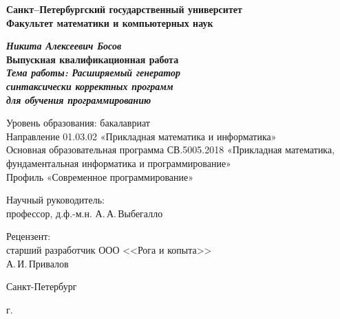 \begin{titlepage}
\begin{center}

\textbf{Санкт--Петербургский государственный университет}\\
\textbf{Факультет математики и компьютерных наук}


\vspace{35mm}

\textbf{\textit{\large Никита Алексеевич Босов}} \\[8mm]
\textbf{\large Выпускная квалификационная работа}\\[3mm]
\textbf{\textit{\large Тема работы:  Расширяемый генератор\\синтаксически корректных программ\\для обучения программированию}}

\vspace{20mm}
Уровень образования: бакалавриат\\
Направление 01.03.02 «Прикладная математика и информатика»\\
Основная образовательная программа СВ.5005.2018
«Прикладная математика, фундаментальная информатика и программирование»\\
Профиль «Современное программирование»\\[25mm]


\begin{flushright}
\begin{minipage}[t]{0.65\textwidth}
{Научный руководитель:} \\
профессор, д.ф.-м.н. А.\,А.\,Выбегалло
\vspace{10mm}

{Рецензент:} \\
старший разработчик ООО <<Рога и копыта>>\\ А.\,И.\,Привалов
\end{minipage}
\end{flushright}

\vfill

{Санкт-Петербург}
\par{\the\year{} г.}
\end{center}
\end{titlepage}
\restoregeometry
\addtocounter{page}{1}
